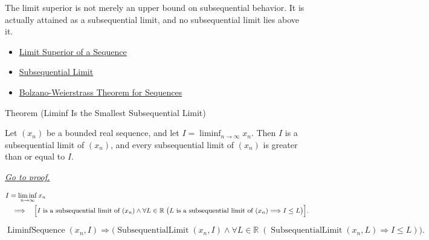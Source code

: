 \begin{remark*}[Interpretation]
The limit superior is not merely an upper bound on subsequential behavior. It
is actually attained as a subsequential limit, and no subsequential limit lies
above it.
\end{remark*}

\begin{dependencies}
\begin{itemize}
  \item \hyperref[def:limsup-sequence]{Limit Superior of a Sequence}
  \item \hyperref[def:subsequential-limit]{Subsequential Limit}
  \item \hyperref[thm:bolzano-weierstrass-sequences]{Bolzano-Weierstrass Theorem for Sequences}
\end{itemize}
\end{dependencies}


\begin{theorembox}{Theorem (Liminf Is the Smallest Subsequential Limit)}
\begin{theorem}
\label{thm:liminf-smallest-subsequential-limit}
Let $(x_n)$ be a bounded real sequence, and let
$I=\liminf_{n\to\infty}x_n$. Then $I$ is a subsequential limit of
$(x_n)$, and every subsequential limit of $(x_n)$ is greater than or
equal to $I$.

\smallskip
\noindent
\hyperref[prf:liminf-smallest-subsequential-limit]{\textit{Go to proof.}}
\end{theorem}
\end{theorembox}

\begin{remark*}
\[
\begin{aligned}
&I=\liminf_{n\to\infty}x_n\\
&\quad\Longrightarrow\quad
\Bigl[
  I\text{ is a subsequential limit of }(x_n)
  \land
  \forall L\in\mathbb{R}\;
  \bigl(L\text{ is a subsequential limit of }(x_n)\Longrightarrow I\le L\bigr)
\Bigr].
\end{aligned}
\]
\end{remark*}

\begin{remark*}
\[
\operatorname{LiminfSequence}(x_n,I)
\Longrightarrow
\bigl(
  \operatorname{SubsequentialLimit}(x_n,I)
  \land
  \forall L\in\mathbb{R}\;
  (\operatorname{SubsequentialLimit}(x_n,L)\Longrightarrow I\le L)
\bigr).
\]
\end{remark*}

